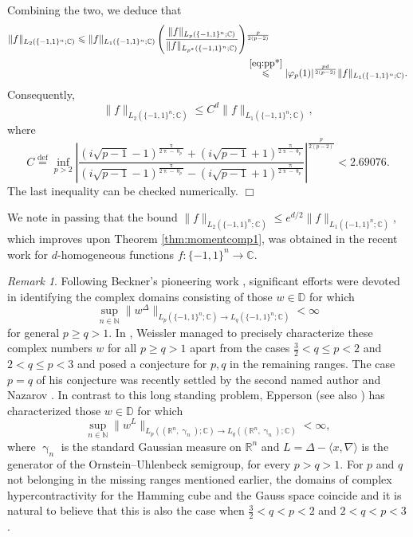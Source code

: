 \documentclass[11pt,reqno]{amsart}
\renewcommand{\leq}{\leqslant}
\renewcommand{\geq}{\geqslant}
\renewcommand{\gamma}{\upgamma}
\renewcommand{\pi}{\uppi}
\newcommand{\R}{\mathbb R}
\newcommand{\1}{\mathbf 1}
\theoremstyle{remark}
\newtheorem{remark}[theorem]{Remark}
\newcommand{\C}{\mathbb C}
\newcommand{\eqdef}{\stackrel{\mathrm{def}}{=}}
\renewcommand{\theta}{\uptheta}
\renewcommand{\gamma}{\upgamma}
\renewcommand{\pi}{\uppi}
\renewcommand{\pi}{\uppi}
\newcommand{\mb}{\mathbb}
\begin{document}
Combining the two, we deduce that
\begin{equation}
\begin{split}
\|f\|_{L_2(\{-1,1\}^n;\C)} \leq \|f\|_{L_1(\{-1,1\}^n;\C)}  \left(\frac{\|f\|_{L_p(\{-1,1\}^n;\C)}}{\|f\|_{L_{p^\ast}(\{-1,1\}^n;\C)}}\right)&^{\frac{p}{2(p-2)}} 
\\ & \stackrel{\eqref{eq:pp*}}{\leq} |\varphi_p(1)|^{\frac{pd}{2(p-2)}} \|f\|_{L_1(\{-1,1\}^n;\C)}.
\end{split}
\end{equation}
Consequently,
\begin{equation}
\|f\|_{L_2(\{-1,1\}^n;\C)} \leq C^d \|f\|_{L_1(\{-1,1\}^n;\C)},
\end{equation}
where
\begin{equation}
C \eqdef \inf_{p>2} \left| \frac{(i\sqrt{p-1}-1)^{\frac{\pi}{2\pi-\theta_p}}+(i\sqrt{p-1}+1)^{\frac{\pi}{2\pi-\theta_p}}}{(i\sqrt{p-1}-1)^{\frac{\pi}{2\pi-\theta_p}}-(i\sqrt{p-1}+1)^{\frac{\pi}{2\pi-\theta_p}}} \right|^{\frac{p}{2(p-2)}} < 2.69076.
\end{equation}
The last inequality can be checked numerically.
\hfill$\Box$

\medskip

We note in passing that the bound $\|f\|_{L_2(\{-1,1\}^n;\mb{C})} \leq e^{d/2} \|f\|_{L_1(\{-1,1\}^n;\mb{C})}$, which improves upon Theorem \ref{thm:momentcomp1}, was obtained in the recent work \cite{IT18} for $d$-homogeneous functions $f:\{-1,1\}^n\to\C$.

\begin{remark} \label{rem:complexhyperc}
Following Beckner's pioneering work \cite{Bec75}, significant efforts were devoted in identifying the complex domains consisting of those $w\in\mb{D}$ for which
\begin{equation}
\sup_{n\in\mb{N}} \|w^{\Delta}\|_{{L_p(\{-1,1\}^n;\C)}\to {L_q(\{-1,1\}^n;\C)}} <\infty
\end{equation}
for general $p\geq q>1$. In \cite{Wei79}, Weissler managed to precisely characterize these complex numbers $w$ for all $p\geq q>1$ apart from the cases $\frac{3}{2}<q \leq p<2$ and $2< q\leq p<3$ and posed a conjecture for $p,q$ in the remaining ranges. The case $p=q$ of his conjecture was recently settled by the second named author and Nazarov \cite{IN19}. In contrast to this long standing problem, Epperson \cite{Epp89} (see also \cite{Jan97}) has characterized those $w\in\mb{D}$ for which
\begin{equation}
\sup_{n\in\mb{N}} \|w^{L}\|_{{L_p((\R^n,\gamma_n);\C)}\to {L_q((\R^n,\gamma_n);\C)}} <\infty,
\end{equation}
where $\gamma_n$ is the standard Gaussian measure on $\R^n$ and $L=\Delta-\langle x, \nabla\rangle$ is the generator of the Ornstein--Uhlenbeck semigroup, for every $p>q>1$. For $p$ and $q$ not belonging in the missing ranges mentioned earlier, the domains of complex hypercontractivity for the Hamming cube and the Gauss space coincide and it is natural to believe that this is also the case when $\frac{3}{2}<q< p<2$ and $2<q< p<3$.
\end{remark}
\end{document}
